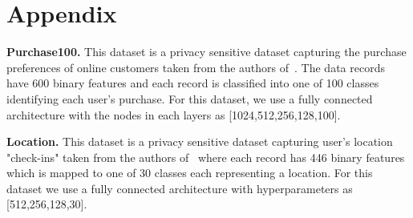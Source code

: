 \section*{Appendix}

\noindent\textbf{Purchase100.} This dataset is a privacy sensitive dataset capturing the purchase preferences of online customers taken from the authors of~\cite{shokri2017membership}.
The data records have 600 binary features and each record is classified into one of 100 classes identifying each user's purchase.
For this dataset, we use a fully connected architecture with the nodes in each layers as [1024,512,256,128,100].

\noindent\textbf{Location.} This dataset is a privacy sensitive dataset capturing user's location "check-ins" taken from the authors of~\cite{shokri2017membership} where each record has 446 binary features which is mapped to one of 30 classes each representing a location. For this dataset we use a fully connected architecture with hyperparameters as [512,256,128,30].

